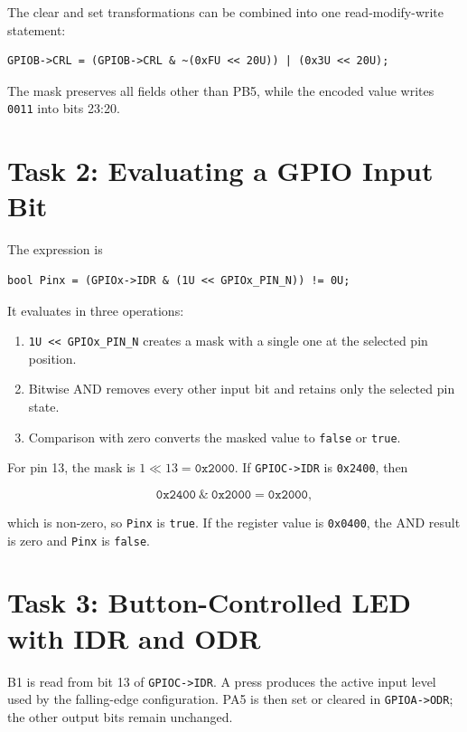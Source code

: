 \documentclass[11pt,a4paper]{article}
\begin{document}
The clear and set transformations can be combined into one read-modify-write statement:

\begin{lstlisting}
GPIOB->CRL = (GPIOB->CRL & ~(0xFU << 20U)) | (0x3U << 20U);
\end{lstlisting}

The mask preserves all fields other than PB5, while the encoded value writes \texttt{0011} into bits 23:20.

\section{Task 2: Evaluating a GPIO Input Bit}

The expression is

\begin{lstlisting}
bool Pinx = (GPIOx->IDR & (1U << GPIOx_PIN_N)) != 0U;
\end{lstlisting}

It evaluates in three operations:

\begin{enumerate}[leftmargin=2em]
  \item \texttt{1U << GPIOx\_PIN\_N} creates a mask with a single one at the selected pin position.
  \item Bitwise AND removes every other input bit and retains only the selected pin state.
  \item Comparison with zero converts the masked value to \texttt{false} or \texttt{true}.
\end{enumerate}

For pin 13, the mask is $1 \ll 13 = \mathtt{0x2000}$. If \texttt{GPIOC->IDR} is \texttt{0x2400}, then

\[
\mathtt{0x2400 \ \& \ 0x2000 = 0x2000},
\]

which is non-zero, so \texttt{Pinx} is \texttt{true}. If the register value is \texttt{0x0400}, the AND result is zero and \texttt{Pinx} is \texttt{false}.

\section{Task 3: Button-Controlled LED with IDR and ODR}

B1 is read from bit 13 of \texttt{GPIOC->IDR}. A press produces the active input level used by the falling-edge configuration. PA5 is then set or cleared in \texttt{GPIOA->ODR}; the other output bits remain unchanged.
\end{document}
